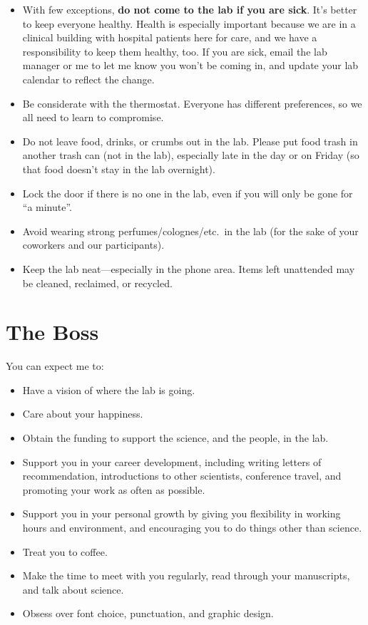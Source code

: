 \documentclass[letterpaper,12pt,oneside]{memoir}
\begin{document}
\begin{itemize}
\item With few exceptions, \textbf{do not come to the lab if you are sick}. It's better to keep everyone healthy. Health is especially important because we are in a clinical building with hospital patients here for care, and we have a responsibility to keep them healthy, too. If you are sick, email the lab manager or me to let me know you won't be coming in, and update your lab calendar to reflect the change.
\item Be considerate with the thermostat. Everyone has different preferences, so we all need to learn to compromise.
\item Do not leave food, drinks, or crumbs out in the lab. Please put food trash in another trash can (not in the lab), especially late in the day or on Friday (so that food doesn't stay in the lab overnight).
\item Lock the door if there is no one in the lab, even if you will only be gone for ``a minute''.
\item Avoid wearing strong perfumes/colognes/etc.\ in the lab (for the sake of your coworkers and our participants).
\item Keep the lab neat---especially in the phone area. Items left unattended may be cleaned, reclaimed, or recycled.
\end{itemize}


\section{The Boss}

You can expect me to:

\begin{itemize}
\item Have a vision of where the lab is going.
\item Care about your happiness.
\item Obtain the funding to support the science, and the people, in the lab.
\item Support you in your career development, including writing letters of recommendation, introductions to other scientists, conference travel, and promoting your work as often as possible.
\item Support you in your personal growth by giving you flexibility in working hours and environment, and encouraging you to do things other than science.
\item Treat you to coffee.
\item Make the time to meet with you regularly, read through your manuscripts, and talk about science.
\item Obsess over font choice, punctuation, and graphic design.
\end{itemize}
\end{document}
